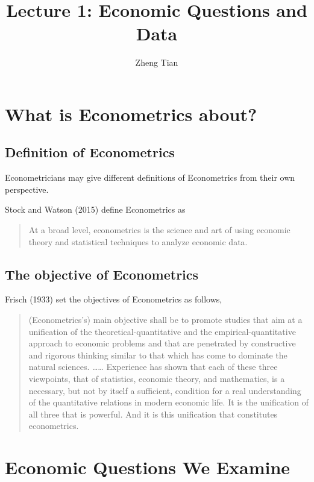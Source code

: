 \documentclass[a4paper,11pt]{article}
\author{Zheng Tian}
\date{}
\title{Lecture 1: Economic Questions and Data}
\begin{document}
\maketitle

\section{What is Econometrics about?}
\label{sec:orga4c3199}

\subsection{Definition of Econometrics}
\label{sec:org142ff02}

Econometricians may give different definitions of Econometrics from
their own perspective.

Stock and Watson (2015) define Econometrics as
\begin{quote}
At a broad level, econometrics is the science and art of using
economic theory and statistical techniques to analyze economic
data.
\end{quote}


\subsection{The objective of Econometrics}
\label{sec:orge6d008f}

Frisch (1933) set the objectives of Econometrics as follows,
\begin{quote}
(Econometrics's) main objective shall be to promote studies that aim at
a unification of the theoretical-quantitative and the
empirical-quantitative approach to economic problems and that are
penetrated by constructive and rigorous thinking similar to that which
has come to dominate the natural sciences. \ldots{}\ldots{} Experience has shown
that each of these three viewpoints, that of statistics, economic
theory, and mathematics, is a necessary, but not by itself a
sufficient, condition for a real understanding of the quantitative
relations in modern economic life. It is the unification of all
three that is powerful. And it is this unification that constitutes
econometrics.
\end{quote}


\section{Economic Questions We Examine}
\label{sec:orgcdf6e69}
\end{document}
